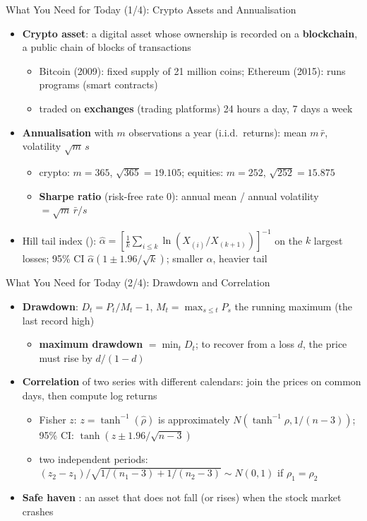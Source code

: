 \begin{frame}{What You Need for Today (1/4): Crypto Assets and Annualisation}
\itemsize{\small}
\begin{itemize}
    \item \textbf{Crypto asset}: a digital asset whose ownership is recorded on a \textbf{blockchain}, a public chain of blocks of transactions
    \begin{itemize}
        \item Bitcoin (2009): fixed supply of 21 million coins; Ethereum (2015): runs programs (smart contracts)
        \item traded on \textbf{exchanges} (trading platforms) 24 hours a day, 7 days a week
    \end{itemize}
    \item \textbf{Annualisation} with $m$ observations a year (i.i.d.\ returns): mean $m\,\bar r$, volatility $\sqrt{m}\,s$
    \begin{itemize}
        \item crypto: $m = 365$, $\sqrt{365} = 19.105$; equities: $m = 252$, $\sqrt{252} = 15.875$
        \item \textbf{Sharpe ratio} (risk-free rate 0): annual mean / annual volatility $= \sqrt{m}\,\bar r/s$
    \end{itemize}
    \item Hill tail index (): $\hat\alpha = [\frac1k\sum_{i \le k}\ln(X_{(i)}/X_{(k+1)})]^{-1}$ on the $k$ largest losses; 95\% CI $\hat\alpha(1 \pm 1.96/\sqrt{k})$; smaller $\alpha$, heavier tail
\end{itemize}
\end{frame}

\begin{frame}{What You Need for Today (2/4): Drawdown and Correlation}
\itemsize{\small}
\begin{itemize}
    \item \textbf{Drawdown}: $D_t = P_t/M_t - 1$, $M_t = \max_{s \le t} P_s$ the running maximum (the last record high)
    \begin{itemize}
        \item \textbf{maximum drawdown} $= \min_t D_t$; to recover from a loss $d$, the price must rise by $d/(1 - d)$
    \end{itemize}
    \item \textbf{Correlation} of two series with different calendars: join the prices on common days, then compute log returns
    \begin{itemize}
        \item Fisher $z$: $z = \tanh^{-1}(\hat\rho)$ is approximately $N(\tanh^{-1}\rho, 1/(n - 3))$; 95\% CI: $\tanh(z \pm 1.96/\sqrt{n - 3})$
        \item two independent periods: $(z_2 - z_1)/\sqrt{1/(n_1 - 3) + 1/(n_2 - 3)} \sim N(0, 1)$ if $\rho_1 = \rho_2$
    \end{itemize}
    \item \textbf{Safe haven} : an asset that does not fall (or rises) when the stock market crashes
\end{itemize}
\end{frame}


